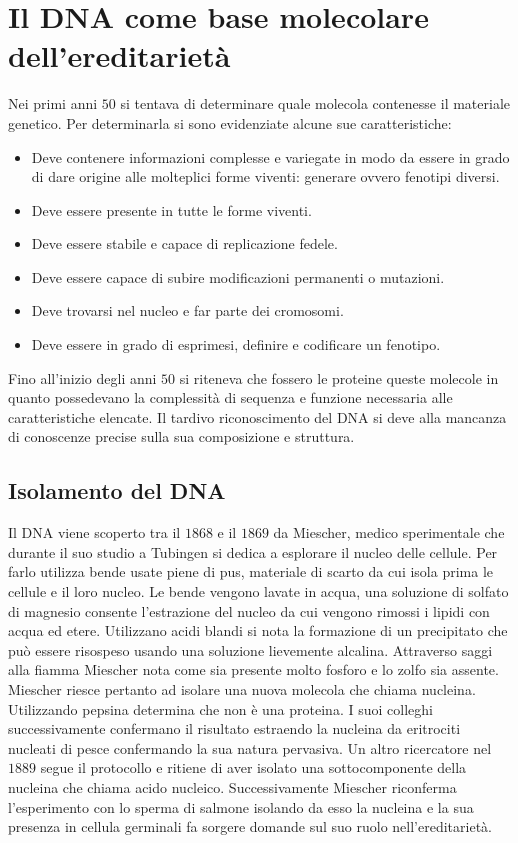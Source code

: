 \section{Il DNA come base molecolare dell'ereditariet\`a}
Nei primi anni $50$ si tentava di determinare quale molecola contenesse il materiale genetico. Per determinarla si sono evidenziate alcune sue caratteristiche:
\begin{multicols}{2}
\begin{itemize}
	\item Deve contenere informazioni complesse e variegate in modo da essere in grado di dare origine alle molteplici forme viventi: generare ovvero fenotipi diversi. 
	\item Deve essere presente in tutte le forme viventi.
	\item Deve essere stabile e capace di replicazione fedele. 
	\item Deve essere capace di subire modificazioni permanenti o mutazioni.
	\item Deve trovarsi nel nucleo e far parte dei cromosomi.
	\item Deve essere in grado di esprimesi, definire e codificare un fenotipo. 
\end{itemize}
\end{multicols}
Fino all'inizio degli anni $50$ si riteneva che fossero le proteine queste molecole in quanto possedevano la complessit\`a di sequenza e funzione necessaria alle caratteristiche 
elencate. Il tardivo riconoscimento del DNA si deve alla mancanza di conoscenze precise sulla sua composizione e struttura. 
\subsection{Isolamento del DNA}
Il DNA viene scoperto tra il $1868$ e il $1869$ da Miescher, medico sperimentale che durante il suo studio a Tubingen si dedica a esplorare il nucleo delle cellule. Per farlo utilizza
bende usate piene di pus, materiale di scarto da cui isola prima le cellule e il loro nucleo. Le bende vengono lavate in acqua, una soluzione di solfato di magnesio consente l'estrazione
del nucleo da cui vengono rimossi i lipidi con acqua ed etere. Utilizzano acidi blandi si nota la formazione di un precipitato  che pu\`o essere risospeso usando una soluzione lievemente
alcalina. Attraverso saggi alla fiamma Miescher nota come sia presente molto fosforo e lo zolfo sia assente. Miescher riesce pertanto ad isolare una nuova molecola che chiama nucleina. 
Utilizzando pepsina determina che non \`e una proteina. I suoi colleghi successivamente confermano il risultato estraendo la nucleina da eritrociti nucleati di pesce confermando la 
sua natura pervasiva. Un altro ricercatore nel $1889$ segue il protocollo e ritiene di aver isolato una sottocomponente della nucleina che chiama acido nucleico. Successivamente 
Miescher riconferma l'esperimento con lo sperma di salmone isolando da esso la nucleina e la sua presenza in cellula germinali fa sorgere domande sul suo ruolo nell'ereditariet\`a. 
